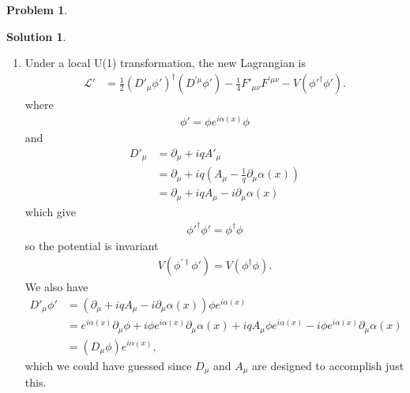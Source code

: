 \documentclass[a4paper,11pt]{article}
\numberwithin{equation}{section}
\theoremstyle{definition}
\newtheorem{prob}{Problem}[section]
\newtheorem{sln}{Solution}[section]
\newcommand{\p}{\partial}
\newcommand{\lag}{\mathcal{L}}
\begin{document}
\begin{prob}
	
		\begin{sln}
			$\,$
			\begin{enumerate}
				\item Under a local U(1) transformation, the new Lagrangian is
				\begin{align}
				\lag' 
				&= \frac{1}{2}(D'_\mu\phi')^\dagger(D^{'\mu}\phi') - \frac{1}{4}F'_{\mu\nu}F^{'\mu\nu} - V(\phi'^\dagger\phi').
				\end{align}
				where
				\begin{align}
				\phi' = \phi e^{i\alpha(x)}\phi
				\end{align}
				and
				\begin{align}
				D'_\mu &= \p_\mu + iqA'_\mu\nonumber\\ 
				&= \p_\mu + iq\left(A_\mu - \frac{1}{q}\p_\mu\alpha(x)\right)\nonumber\\
				&= \p_\mu + iqA_\mu -i \p_\mu\alpha(x)
				\end{align}
				which give
				\begin{align}
				\phi'^\dagger\phi' = \phi^\dagger\phi
				\end{align}
				so the potential is invariant
				\begin{align}
				V(\phi^{'\dagger}\phi') = V(\phi^\dagger\phi).
				\end{align}
				We also have
				\begin{align}
				D'_\mu\phi' &= (\p_\mu + iqA_\mu -i \p_\mu\alpha(x))\phi e^{i\alpha(x)}\nonumber\\
				&= e^{i\alpha(x)}\p_\mu \phi + i\phi e^{i\alpha(x)} \p_\mu\alpha(x) + iqA_\mu \phi e^{i\alpha(x)} - i \phi e^{i\alpha(x)} \p_\mu\alpha(x) \nonumber\\
				&= (D_\mu \phi)e^{i\alpha(x)},
				\end{align}
				which we could have guessed since $D_\mu$ and $A_\mu$ are designed to accomplish just this.\\
				

\end{enumerate}
\end{sln}
\end{prob}
\end{document}
